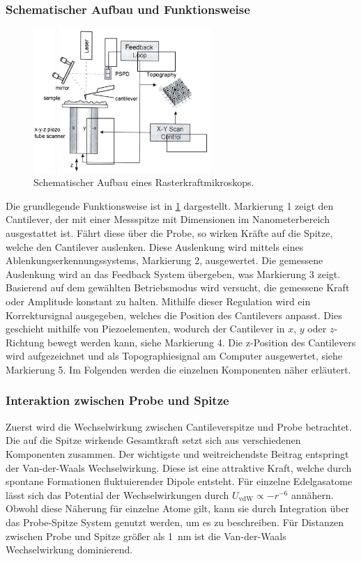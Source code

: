 \subsubsection{Schematischer Aufbau und Funktionsweise}
\begin{figure}
    \centering
    \includegraphics[width=0.6\textwidth]{../assets/messmethoden/afm/01_aufbau}
    \caption{Schematischer Aufbau eines Rasterkraftmikroskops. }
    \label{fig:afm_aufbau}
\end{figure}
Die grundlegende Funktionsweise ist in \cref{fig:afm_aufbau} dargestellt.
Markierung 1 zeigt den Cantilever, der mit einer Messspitze mit Dimensionen im Nanometerbereich ausgestattet ist.
Fährt diese über die Probe, so wirken Kräfte auf die Spitze, welche den Cantilever auslenken.
Diese Auslenkung wird mittels eines Ablenkungserkennungssystems, Markierung 2, ausgewertet.
Die gemessene Auslenkung wird an das Feedback System übergeben, was Markierung 3 zeigt.
Basierend auf dem gewählten Betriebsmodus wird versucht, die gemessene Kraft oder Amplitude konstant zu halten.
Mithilfe dieser Regulation wird ein Korrektursignal ausgegeben, welches die Position des Cantilevers anpasst.
Dies geschieht mithilfe von Piezoelementen, wodurch der Cantilever in $x$, $y$ oder $z$-Richtung bewegt werden kann,
siehe Markierung 4.
Die z-Position des Cantilevers wird aufgezeichnet und als Topographiesignal am Computer ausgewertet, siehe Markierung 5.
Im Folgenden werden die einzelnen Komponenten näher erläutert.\autocite[8-10]{afm-buch}

\subsubsection{Interaktion zwischen Probe und Spitze}
Zuerst wird die Wechselwirkung zwischen Cantileverspitze und Probe betrachtet.
Die auf die Spitze wirkende Gesamtkraft setzt sich aus verschiedenen Komponenten zusammen.
Der wichtigste und weitreichendste Beitrag entspringt der Van-der-Waals Wechselwirkung.
Diese ist eine attraktive Kraft, welche durch spontane Formationen fluktuierender Dipole entsteht.
Für einzelne Edelgasatome lässt sich das Potential der Wechselwirkungen durch
$U_{\mathrm{vdW}}\propto-r^{-6}$ annähern.
Obwohl diese Näherung für einzelne Atome gilt, kann sie durch Integration über das Probe-Spitze System genutzt
werden, um es zu beschreiben.
Für Distanzen zwischen Probe und Spitze größer als \qty{1}{\nano\meter} ist die Van-der-Waals Wechselwirkung
dominierend.

